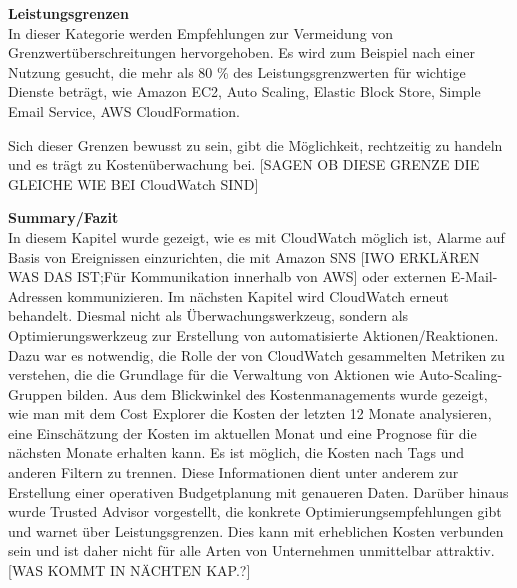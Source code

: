 \textbf{Leistungsgrenzen}\\
In dieser Kategorie werden Empfehlungen zur Vermeidung von Grenzwertüberschreitungen hervorgehoben.
Es wird zum Beispiel nach einer Nutzung gesucht, die mehr als 80 \% des Leistungsgrenzwerten für wichtige Dienste beträgt, wie  Amazon EC2, Auto Scaling, Elastic Block Store, Simple Email Service, AWS CloudFormation.

Sich dieser Grenzen bewusst zu sein, gibt die Möglichkeit, rechtzeitig zu handeln und es trägt zu Kostenüberwachung bei.
[SAGEN OB DIESE GRENZE DIE GLEICHE WIE BEI CloudWatch SIND]

\textbf{Summary/Fazit}\\
In diesem Kapitel wurde gezeigt, wie es mit CloudWatch möglich ist, Alarme auf Basis von Ereignissen einzurichten, die mit Amazon SNS [IWO ERKLÄREN WAS DAS IST;Für Kommunikation innerhalb von AWS] oder externen E-Mail-Adressen kommunizieren. Im nächsten Kapitel wird CloudWatch erneut behandelt. Diesmal nicht als Überwachungswerkzeug, sondern als Optimierungswerkzeug zur Erstellung von automatisierte Aktionen/Reaktionen. Dazu war es notwendig, die Rolle der von CloudWatch gesammelten Metriken zu verstehen, die die Grundlage für die Verwaltung von Aktionen wie Auto-Scaling-Gruppen bilden. 
Aus dem Blickwinkel des Kostenmanagements wurde gezeigt, wie man mit dem Cost Explorer die Kosten der letzten 12 Monate analysieren, eine Einschätzung der Kosten im aktuellen Monat und eine Prognose für die nächsten Monate erhalten kann. Es ist möglich, die Kosten nach Tags und anderen Filtern zu trennen. Diese Informationen dient unter anderem zur Erstellung einer operativen Budgetplanung mit genaueren Daten.
Darüber hinaus wurde Trusted Advisor vorgestellt, die konkrete Optimierungsempfehlungen gibt und warnet über Leistungsgrenzen. Dies kann mit erheblichen Kosten verbunden sein und ist daher nicht für alle Arten von Unternehmen unmittelbar attraktiv. 
[WAS KOMMT IN NÄCHTEN KAP.?]

